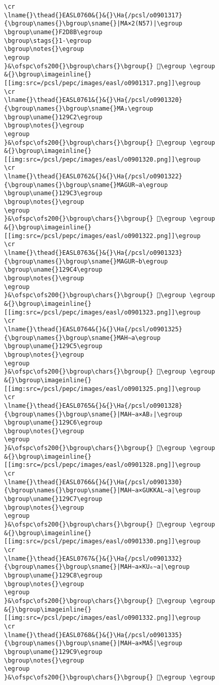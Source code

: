 \begin{verbatim}
\cr
\lname{}\thead{}EASL0760&{}&{}\Ha{/pcsl/o0901317}{\bgroup\names{}\bgroup\sname{}|MA×2(N57)|\egroup
\bgroup\uname{}F2D8B\egroup
\bgroup\stags{}1-\egroup
\bgroup\notes{}\egroup
\egroup
}&\ofspc\ofs200{}\bgroup\chars{}\bgroup{} 󲶋\egroup \egroup
&{}\bgroup\imageinline{}[[img:src=/pcsl/pepc/images/easl/o0901317.png]]\egroup
\cr
\lname{}\thead{}EASL0761&{}&{}\Ha{/pcsl/o0901320}{\bgroup\names{}\bgroup\sname{}MA₂\egroup
\bgroup\uname{}129C2\egroup
\bgroup\notes{}\egroup
\egroup
}&\ofspc\ofs200{}\bgroup\chars{}\bgroup{} 𒧂\egroup \egroup
&{}\bgroup\imageinline{}[[img:src=/pcsl/pepc/images/easl/o0901320.png]]\egroup
\cr
\lname{}\thead{}EASL0762&{}&{}\Ha{/pcsl/o0901322}{\bgroup\names{}\bgroup\sname{}MAGUR∼a\egroup
\bgroup\uname{}129C3\egroup
\bgroup\notes{}\egroup
\egroup
}&\ofspc\ofs200{}\bgroup\chars{}\bgroup{} 𒧃\egroup \egroup
&{}\bgroup\imageinline{}[[img:src=/pcsl/pepc/images/easl/o0901322.png]]\egroup
\cr
\lname{}\thead{}EASL0763&{}&{}\Ha{/pcsl/o0901323}{\bgroup\names{}\bgroup\sname{}MAGUR∼b\egroup
\bgroup\uname{}129C4\egroup
\bgroup\notes{}\egroup
\egroup
}&\ofspc\ofs200{}\bgroup\chars{}\bgroup{} 𒧄\egroup \egroup
&{}\bgroup\imageinline{}[[img:src=/pcsl/pepc/images/easl/o0901323.png]]\egroup
\cr
\lname{}\thead{}EASL0764&{}&{}\Ha{/pcsl/o0901325}{\bgroup\names{}\bgroup\sname{}MAH∼a\egroup
\bgroup\uname{}129C5\egroup
\bgroup\notes{}\egroup
\egroup
}&\ofspc\ofs200{}\bgroup\chars{}\bgroup{} 𒧅\egroup \egroup
&{}\bgroup\imageinline{}[[img:src=/pcsl/pepc/images/easl/o0901325.png]]\egroup
\cr
\lname{}\thead{}EASL0765&{}&{}\Ha{/pcsl/o0901328}{\bgroup\names{}\bgroup\sname{}|MAH∼a×AB₂|\egroup
\bgroup\uname{}129C6\egroup
\bgroup\notes{}\egroup
\egroup
}&\ofspc\ofs200{}\bgroup\chars{}\bgroup{} 𒧆\egroup \egroup
&{}\bgroup\imageinline{}[[img:src=/pcsl/pepc/images/easl/o0901328.png]]\egroup
\cr
\lname{}\thead{}EASL0766&{}&{}\Ha{/pcsl/o0901330}{\bgroup\names{}\bgroup\sname{}|MAH∼a×GUKKAL∼a|\egroup
\bgroup\uname{}129C7\egroup
\bgroup\notes{}\egroup
\egroup
}&\ofspc\ofs200{}\bgroup\chars{}\bgroup{} 𒧇\egroup \egroup
&{}\bgroup\imageinline{}[[img:src=/pcsl/pepc/images/easl/o0901330.png]]\egroup
\cr
\lname{}\thead{}EASL0767&{}&{}\Ha{/pcsl/o0901332}{\bgroup\names{}\bgroup\sname{}|MAH∼a×KU₆∼a|\egroup
\bgroup\uname{}129C8\egroup
\bgroup\notes{}\egroup
\egroup
}&\ofspc\ofs200{}\bgroup\chars{}\bgroup{} 𒧈\egroup \egroup
&{}\bgroup\imageinline{}[[img:src=/pcsl/pepc/images/easl/o0901332.png]]\egroup
\cr
\lname{}\thead{}EASL0768&{}&{}\Ha{/pcsl/o0901335}{\bgroup\names{}\bgroup\sname{}|MAH∼a×MAŠ|\egroup
\bgroup\uname{}129C9\egroup
\bgroup\notes{}\egroup
\egroup
}&\ofspc\ofs200{}\bgroup\chars{}\bgroup{} 𒧉\egroup \egroup

\end{verbatim}
